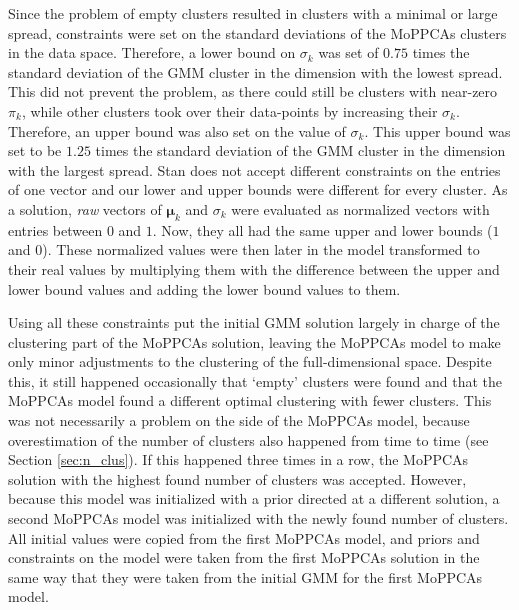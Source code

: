 Since the problem of empty clusters resulted in clusters with a minimal or large spread, constraints were set on the standard deviations of the MoPPCAs clusters in the data space. Therefore, a lower bound on $\sigma_k$ was set of $0.75$ times the standard deviation of the GMM cluster in the dimension with the lowest spread. This did not prevent the problem, as there could still be clusters with near-zero $\pi_k$, while other clusters took over their data-points by increasing their $\sigma_k$. Therefore, an upper bound was also set on the value of $\sigma_k$. This upper bound was set to be $1.25$ times the standard deviation of the GMM cluster in the dimension with the largest spread. Stan does not accept different constraints on the entries of one vector and our lower and upper bounds were different for every cluster. As a solution, \textit{raw} vectors of $\bm{\mu}_k$ and $\sigma_k$ were evaluated as normalized vectors with entries between $0$ and $1$. Now, they all had the same upper and lower bounds ($1$ and $0$). These normalized values were then later in the model transformed to their real values by multiplying them with the difference between the upper and lower bound values and adding the lower bound values to them.

Using all these constraints put the initial GMM solution largely in charge of the clustering part of the MoPPCAs solution, leaving the MoPPCAs model to make only minor adjustments to the clustering of the full-dimensional space. Despite this, it still happened occasionally that `empty' clusters were found and that the MoPPCAs model found a different optimal clustering with fewer clusters. This was not necessarily a problem on the side of the MoPPCAs model, because overestimation of the number of clusters also happened from time to time (see Section \ref{sec:n_clus}). If this happened three times in a row, the MoPPCAs solution with the highest found number of clusters was accepted. However, because this model was initialized with a prior directed at a different solution, a second MoPPCAs model was initialized with the newly found number of clusters. All initial values were copied from the first MoPPCAs model, and priors and constraints on the model were taken from the first MoPPCAs solution in the same way that they were taken from the initial GMM for the first MoPPCAs model.

